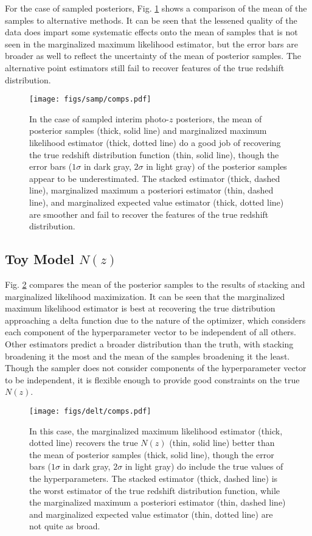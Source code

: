 For the case of sampled posteriors, Fig. \ref{fig:samp-comp} shows a comparison 
of the mean of the samples to alternative methods.  It can be seen that the 
lessened quality of the data does impart some systematic effects onto the mean 
of samples that is not seen in the marginalized maximum likelihood estimator, 
but the error bars are broader as well to reflect the uncertainty of the mean 
of posterior samples.  The alternative point estimators still fail to recover 
features of the true redshift distribution.

\begin{figure}
	\texttt{[image: figs/samp/comps.pdf]}
	\caption{In the case of sampled interim photo-$z$ posteriors, the mean of 
		posterior samples (thick, solid line) and marginalized maximum likelihood 
		estimator (thick, dotted line) do a good job of recovering the true redshift 
		distribution function (thin, solid line), though the error bars ($1\sigma$ in 
		dark gray, $2\sigma$ in light gray) of the posterior samples appear to be 
		underestimated.  The stacked estimator (thick, dashed line), marginalized 
		maximum a posteriori estimator (thin, dashed line), and marginalized expected 
		value estimator (thick, dotted line) are smoother and fail to recover the 
		features of the true redshift distribution.}
	\label{fig:samp-comp}
\end{figure}

\subsection{Toy Model $N(z)$}

Fig. \ref{fig:toy-comp} compares the mean of the posterior samples to the 
results of stacking and marginalized likelihood maximization.  It can be seen 
that the marginalized maximum likelihood estimator is best at recovering the 
true distribution approaching a delta function due to the nature of the 
optimizer, which considers each component of the hyperparameter vector to be 
independent of all others.  Other estimators predict a broader distribution 
than the truth, with stacking broadening it the most and the mean of the 
samples broadening it the least.  Though the sampler does not consider 
components of the hyperparameter vector to be independent, it is flexible 
enough to provide good constraints on the true $N(z)$.

\begin{figure}
	\texttt{[image: figs/delt/comps.pdf]}
	\caption{In this case, the marginalized maximum likelihood estimator (thick, 
		dotted line) recovers the true $N(z)$ (thin, solid line) better than the mean 
		of posterior samples (thick, solid line), though the error bars ($1\sigma$ in 
		dark gray, $2\sigma$ in light gray) do include the true values of the 
		hyperparameters.  The stacked estimator (thick, dashed line) is the worst 
		estimator of the true redshift distribution function, while the marginalized 
		maximum a posteriori estimator (thin, dashed line) and marginalized expected 
		value estimator (thin, dotted line) are not quite as broad.}
	\label{fig:toy-comp}
\end{figure}

